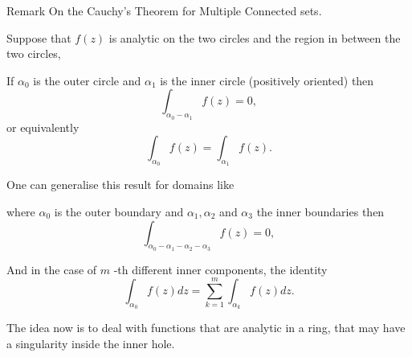 \documentclass{amsart}
\begin{document}
\alert{Remark} On the Cauchy's Theorem for Multiple Connected sets.


Suppose that \(f(z)\) is analytic on the two circles and the region in between the two circles,

\begin{center}

\end{center}

If \(\alpha_0\) is the outer circle and \(\alpha_1\) is the inner circle (positively oriented) then
\[ \int_{\alpha_0 - \alpha_1}f(z) = 0,\]
or equivalently
\[ \int_{\alpha_0}f(z) = \int_{\alpha_1}f(z) .\]

One can generalise this result for domains like
\begin{center}

\end{center}

where \(\alpha_0\) is the outer boundary and \(\alpha_1, \alpha_2\) and \(\alpha_3\) the inner boundaries then
\[ \int_{\alpha_0 - \alpha_1 - \alpha_2 - \alpha_3}f(z) = 0,\]

And in the case of \(m\) -th different inner components, the identity
\[ \int_{\alpha_0}f(z)dz = \sum_{k=1}^{m} \int_{\alpha_k}f(z)dz.\]

The idea now is to deal with functions that are analytic in a ring, that may have a singularity inside the inner hole.
\end{document}
